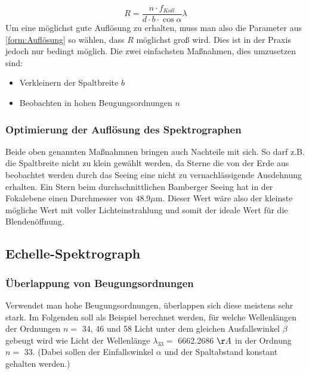 \begin{equation}
R = \frac{n \cdot f_{Koll}}{d \cdot b \cdot \cos \alpha} \lambda
\label{form:Auflösung}
\end{equation}
Um eine möglichst gute Auflösung zu erhalten, muss man also die Parameter aus \eqref{form:Auflösung} so wählen, dass $ R $ möglichst groß wird. Dies ist in der Praxis jedoch nur bedingt möglich. Die zwei einfachsten Maßnahmen, dies umzusetzen sind:

\begin{itemize}

\item Verkleinern der Spaltbreite $ b $

\item Beobachten in hohen Beugungsordnungen $ n $

\end{itemize}

\subsubsection{Optimierung der Auflösung des Spektrographen}
Beide oben genannten Maßnahmnen bringen auch Nachteile mit sich. So darf z.B. die Spaltbreite nicht zu klein gewählt werden, da Sterne die von der Erde aus beobachtet werden durch das Seeing eine nicht zu vernachlässigende Ausdehnung erhalten. Ein Stern beim durchschnittlichen Bamberger Seeing hat in der Fokalebene einen Durchmesser von $48.9 \mu \mathrm{m} $. Dieser Wert wäre also der kleinste mögliche Wert mit voller Lichteinstrahlung und somit der ideale Wert für die Blendenöffnung.

\subsection{Echelle-Spektrograph}
\subsubsection{Überlappung von Beugungsordnungen}
Verwendet man hohe Beugungsordnungen, überlappen sich diese meistens sehr stark. Im Folgenden soll als Beispiel berechnet werden, für welche Wellenlängen der Ordnungen $ n = $ 34, 46 und 58 Licht unter dem gleichen Ausfallswinkel  $ \beta $ gebeugt wird wie Licht der Wellenlänge $ \lambda_{33} = $ 6662.2686 $ \AA $ in der Ordnung $ n = $ 33. (Dabei sollen der Einfallswinkel $ \alpha $ und der Spaltabstand konstant gehalten werden.)\\

